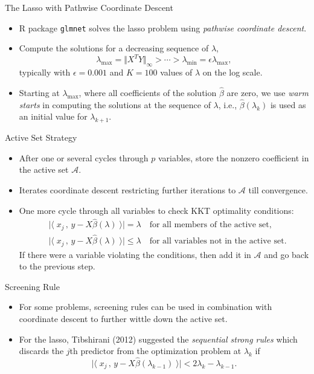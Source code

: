 \documentclass[blue, 10pt]{beamer}
\begin{document}
\begin{frame}{The Lasso with Pathwise Coordinate Descent}

  \begin{itemize}
    \item R package \texttt{glmnet} solves the lasso problem using \textit{pathwise coordinate descent}.
    \item Compute the solutions for a decreasing sequence of $\lambda$,
    $$\lambda_{\max} = \Vert X^T Y \Vert_{\infty} > \cdots > \lambda_{\min} = \epsilon \lambda_{\max},$$
    typically with $\epsilon = 0.001$ and $K = 100$ values of $\lambda$ on the log scale.
    \item Starting at $\lambda_{\max}$, where all coefficients of the solution $\hat\beta$ are zero, we use \textit{warm starts} in computing the solutions at the sequence of $\lambda$, i.e., $\hat{\beta} (\lambda_k)$ is used as an initial value for $\lambda_{k+1}$.
  \end{itemize}
  
\end{frame}


\begin{frame}{Active Set Strategy}

  \begin{itemize}
    \item After one or several cycles through $p$ variables, store the nonzero coefficient in the active set $\mathcal{A}$.
    \item Iterates coordinate descent restricting further iterations to $\mathcal{A}$ till convergence.
    \item One more cycle through all variables to check KKT optimality conditions:
    \begin{align*}
      & \big|\langle\; x_j \,,\,y-X\hat\beta(\lambda)\;\rangle\big| = \lambda\quad \text{for all members of the active set}, \\
      & \big|\langle\; x_j \,,\,y-X\hat\beta(\lambda)\;\rangle\big| \leq \lambda\quad \text{for all variables not in the active set}.
    \end{align*} 
    If there were a variable violating the conditions, then add it in $\mathcal{A}$ and go back to the previous step.
  \end{itemize}

\end{frame}


\begin{frame}{Screening Rule}

  \begin{itemize}
    \item For some problems, screening rules can be used in combination with coordinate descent to further wittle down the active set.
    \item For the lasso, Tibshirani (2012) suggested the \textit{sequential strong rules} which discards the $j$th predictor from the optimization problem at $\lambda_k$ if $$\big|\langle\; x_j \,,\,y-X\hat\beta(\lambda_{k-1})\;\rangle\big|<2\lambda_k - \lambda_{k-1}.$$
  \end{itemize}

\end{frame}
\end{document}
